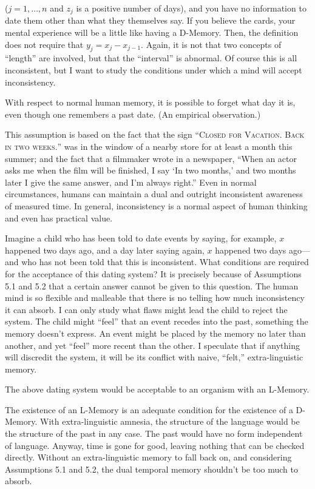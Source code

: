 ($j=1,\ldots,n$ and $z_j$ is a positive number of days), and you have no 
information to date them other than what they themselves say. If you 
believe the cards, your mental experience will be a little like having a 
D-Memory. Then, the definition does not require that $y_j=x_j-x_{j-1}$. Again, it is 
not that two concepts of \enquote{length} are involved, but that the \enquote{interval} is 
abnormal. Of course this is all inconsistent, but I want to study the 
conditions under which a mind will accept inconsistency. 

\begin{hangers}
 With respect to normal human memory, it is possible 
to forget what day it is, even though one remembers a past date. (An 
empirical observation.) 

 This assumption is based on the fact that the sign 
\enquote{\textsc{Closed for Vacation. Back in two weeks.}} was in the window of 
a nearby store for at least a month this summer; and the fact that a 
filmmaker wrote in a newspaper, \enquote{When an actor asks me when the film will 
be finished, I say \enquote{In two months,} and two months later I give the same 
answer, and I'm always right.} Even in normal circumstances, humans can 
maintain a dual and outright inconsistent awareness of measured time. In 
general, inconsistency is a normal aspect of human thinking and even has 
practical value. 
\end{hangers}

Imagine a child who has been told to date events by saying, for 
example, $x$ happened two days ago, and a day later saying again, $x$ happened 
two days ago---and who has not been told that this is inconsistent. What 
conditions are required for the acceptance of this dating system? It is 
precisely because of Assumptions 5.1 and 5.2 that a certain answer cannot 
be given to this question. The human mind is so flexible and malleable that 
there is no telling how much inconsistency it can absorb. I can only study 
what flaws might lead the child to reject the system. The child might \enquote{feel} 
that an event recedes into the past, something the memory doesn't express. 
An event might be placed by the memory no later than another, and yet 
\enquote{feel} more recent than the other. I speculate that if anything will discredit 
the system, it will be its conflict with naive, \enquote{felt,} extra-linguistic memory. 

\begin{hangers}
 The above dating system would be acceptable to an 
organism with an L-Memory. 

 The existence of an L-Memory is an adequate condition 
for the existence of a D-Memory. With extra-linguistic amnesia, the 
structure of the language would be the structure of the past in any case. The 
past would have no form independent of language. Anyway, time is gone for 
good, leaving nothing that can be checked directly. Without an 
extra-linguistic memory to fall back on, and considering Assumptions 5.1 
and 5.2, the dual temporal memory shouldn't be too much to absorb. 
\end{hangers}

